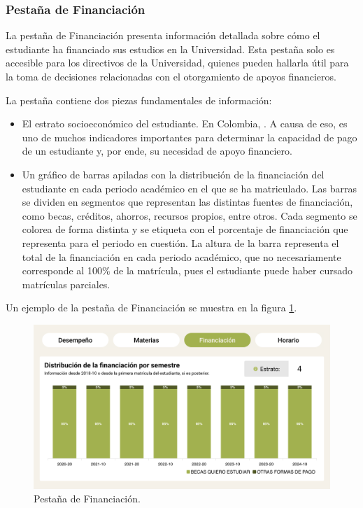 \subsubsection{Pestaña de Financiación}

La pestaña de Financiación presenta información detallada sobre cómo el estudiante ha financiado sus estudios en la Universidad. Esta pestaña solo es accesible para los directivos de la Universidad, quienes pueden hallarla útil para la toma de decisiones relacionadas con el otorgamiento de apoyos financieros.

La pestaña contiene dos piezas fundamentales de información:
\begin{itemize}
	\item El estrato socioeconómico del estudiante. En Colombia,  \cite{estrato}. A causa de eso, es uno de muchos indicadores importantes para determinar la capacidad de pago de un estudiante y, por ende, su necesidad de apoyo financiero.
	\item Un gráfico de barras apiladas con la distribución de la financiación del estudiante en cada periodo académico en el que se ha matriculado. Las barras se dividen en segmentos que representan las distintas fuentes de financiación, como becas, créditos, ahorros, recursos propios, entre otros. Cada segmento se colorea de forma distinta y se etiqueta con el porcentaje de financiación que representa para el periodo en cuestión. La altura de la barra representa el total de la financiación en cada periodo académico, que no necesariamente corresponde al 100\% de la matrícula, pues el estudiante puede haber cursado matrículas parciales.
\end{itemize}
Un ejemplo de la pestaña de Financiación se muestra en la figura \ref{fig:financiacion}.

\begin{figure}[H]
	\includegraphics[width=\textwidth]{assets/nes/financiacion.png}
	\caption{Pestaña de Financiación.}
	\label{fig:financiacion}
\end{figure}

